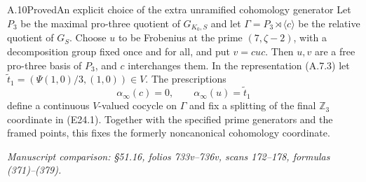 \begin{statement}{A.10}{Proved}{An explicit choice of the extra unramified cohomology generator}
Let $P_3$ be the maximal pro-three quotient of $G_{K_0,S}$ and
let $\Gamma=P_3\rtimes\langle c\rangle$ be the relative quotient
of $G_S$. Choose $u$ to be Frobenius at the prime
$(7,\zeta-2)$, with a decomposition group fixed once and for all,
and put $v=cuc$. Then $u,v$ are a free pro-three basis of $P_3$,
and $c$ interchanges them. In the representation (A.7.3) let
$\widetilde t_1=(\Psi(1,0)/3,(1,0))\in V$. The prescriptions
\[
 \alpha_\infty(c)=0,\qquad
 \alpha_\infty(u)=\widetilde t_1
 \tag{A.10.1}
\]
define a continuous $V$-valued cocycle on $\Gamma$ and fix a
splitting of the final $\mathbb Z_3$ coordinate in (E24.1).
Together with the specified prime generators and the framed points,
this fixes the formerly noncanonical cohomology coordinate.
\par\smallskip\noindent\emph{Manuscript comparison: \S51.16,
folios 733v--736v, scans 172--178, formulas (371)--(379).}
\end{statement}
